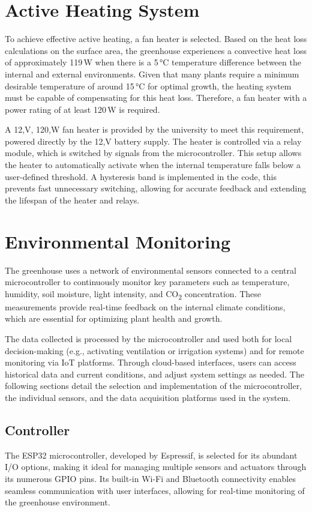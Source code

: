 \section{Active Heating System}
To achieve effective active heating, a fan heater is selected. Based on the heat loss calculations on the surface area, the greenhouse experiences a convective heat loss of approximately 119\,W when there is a 5\,°C temperature difference between the internal and external environments. Given that many plants require a minimum desirable temperature of around 15\,°C for optimal growth, the heating system must be capable of compensating for this heat loss. Therefore, a fan heater with a power rating of at least 120\,W is required.

A 12,V, 120,W fan heater is provided by the university to meet this requirement, powered directly by the 12,V battery supply. The heater is controlled via a relay module, which is switched by signals from the microcontroller. This setup allows the heater to automatically activate when the internal temperature falls below a user-defined threshold. A hysteresis band is implemented in the code, this prevents fast unnecessary switching, allowing for accurate feedback and extending the lifespan of the heater and relays.


\section{Environmental Monitoring}
\label{sec:environmental_monitoring}
The greenhouse uses a network of environmental sensors connected to a central microcontroller to continuously monitor key parameters such as temperature, humidity, soil moisture, light intensity, and CO\textsubscript{2} concentration. These measurements provide real-time feedback on the internal climate conditions, which are essential for optimizing plant health and growth. 

The data collected is processed by the microcontroller and used both for local decision-making (e.g., activating ventilation or irrigation systems) and for remote monitoring via IoT platforms. Through cloud-based interfaces, users can access historical data and current conditions, and adjust system settings as needed. The following sections detail the selection and implementation of the microcontroller, the individual sensors, and the data acquisition platforms used in the system.

\subsection{Controller}
\label{subsec:controller}
The ESP32 microcontroller, developed by Espressif, is selected for its abundant I/O options, making it ideal for managing multiple sensors and actuators through its numerous GPIO pins. Its built-in Wi-Fi and Bluetooth connectivity enables seamless communication with user interfaces, allowing for real-time monitoring of the greenhouse environment.

